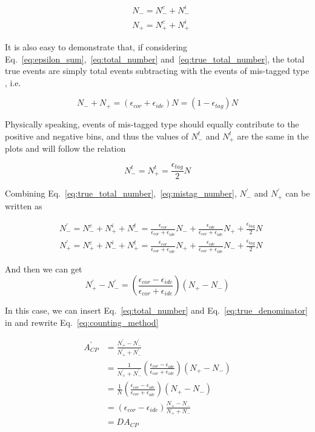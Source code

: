 \begin{align}\label{eq:true_total_number}
    & N_- = N^c_- + N^i_- \\
    & N_+ = N^c_+ + N^i_+ 
\end{align}

It is also easy to demonstrate that, if considering Eq.~\ref{eq:epsilon_sum},~\ref{eq:total_number} and~\ref{eq:true_total_number}, the total true events are simply total events subtracting with the events of mis-tagged type , i.e.

\begin{equation}\label{eq:true_denominator}
    N_- + N_+ = (\epsilon_{cor} + \epsilon_{ide} ) N = (1 - \epsilon_{tag}) N 
\end{equation}

Physically speaking, events of mis-tagged type should equally contribute to the positive and negative bins, and thus the values of $N^{t}_{-}$ and $N^{t}_{+}$ are the same in the plots and will follow the relation

\begin{equation}\label{eq:mistag_number}
    N^{t}_{-} = N^{t}_{+} = \frac{\epsilon_{tag}}{2} N
\end{equation}

Combining Eq.~\ref{eq:true_total_number},~\ref{eq:mistag_number}, $N^{\prime}_{-}$ and $N^{\prime}_{+}$ can be written as 

\begin{align}\label{eq:effective_number}
    & N^\prime_- = N^c_- + N^i_+ + N^t_- = \frac{\epsilon_{cor}}{\epsilon_{cor}+\epsilon_{ide}} N_- + \frac{\epsilon_{ide}}{\epsilon_{cor}+\epsilon_{ide}} N_+ + \frac{\epsilon_{tag}}{2} N \\
    & N^\prime_+ = N^c_+ + N^i_- + N^t_+ = \frac{\epsilon_{cor}}{\epsilon_{cor}+\epsilon_{ide}} N_+ + \frac{\epsilon_{ide}}{\epsilon_{cor}+\epsilon_{ide}} N_- + \frac{\epsilon_{tag}}{2} N
\end{align}

And then we can get 
\begin{equation}\label{eq:effective_numerator}
    N^\prime_+ - N^\prime_- = \left( \frac{\epsilon_{cor} - \epsilon_{ide} }{ \epsilon_{cor} + \epsilon_{ide} } \right) (N_+ - N_-)
\end{equation}

In this case, we can insert Eq.~\ref{eq:total_number} and Eq.~\ref{eq:true_denominator} in and rewrite Eq.~\ref{eq:counting_method}

\begin{align}\label{eq:acp_realtion}
    A^\prime_{CP} &= \frac{ N^\prime_+ - N^\prime_- }{ N^\prime_+ + N^\prime_- } \\
                  &= \frac{1}{ N^\prime_+ + N^\prime_- }  \left( \frac{\epsilon_{cor} - \epsilon_{ide} }{ \epsilon_{cor} + \epsilon_{ide} } \right) (N_+ - N_-) \\
                  &= \frac{1}{ N } \left( \frac{\epsilon_{cor} - \epsilon_{ide} }{ \epsilon_{cor} + \epsilon_{ide} } \right) (N_+ - N_-) \\
                  &= ( \epsilon_{cor} - \epsilon_{ide} )  \frac{ N_+ - N_- }{ N_+ + N_- } \\
                  &= D A_{CP}
\end{align}

